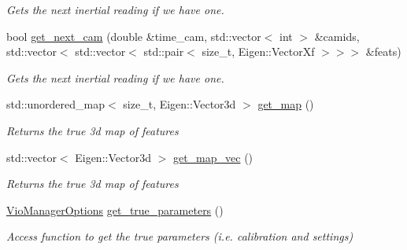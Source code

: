 \begin{DoxyCompactItemize}
\begin{DoxyCompactList}\small\item\em Gets the next inertial reading if we have one. \end{DoxyCompactList}\item 
bool \hyperlink{classov__msckf_1_1Simulator_add03be2fbfa53224369b07411b6a81b7}{get\+\_\+next\+\_\+cam} (double \&time\+\_\+cam, std\+::vector$<$ int $>$ \&camids, std\+::vector$<$ std\+::vector$<$ std\+::pair$<$ size\+\_\+t, Eigen\+::\+Vector\+Xf $>$$>$$>$ \&feats)
\begin{DoxyCompactList}\small\item\em Gets the next inertial reading if we have one. \end{DoxyCompactList}\item 
\mbox{\label{classov__msckf_1_1Simulator_aca2fcef0b73e4c570049030438caa60b}} 
std\+::unordered\+\_\+map$<$ size\+\_\+t, Eigen\+::\+Vector3d $>$ \hyperlink{classov__msckf_1_1Simulator_aca2fcef0b73e4c570049030438caa60b}{get\+\_\+map} ()
\begin{DoxyCompactList}\small\item\em Returns the true 3d map of features \end{DoxyCompactList}\item 
\mbox{\label{classov__msckf_1_1Simulator_aa6f03a9aefbf97bccf950059608bd3c1}} 
std\+::vector$<$ Eigen\+::\+Vector3d $>$ \hyperlink{classov__msckf_1_1Simulator_aa6f03a9aefbf97bccf950059608bd3c1}{get\+\_\+map\+\_\+vec} ()
\begin{DoxyCompactList}\small\item\em Returns the true 3d map of features \end{DoxyCompactList}\item 
\mbox{\label{classov__msckf_1_1Simulator_a3a7f99eb6dd01918d88f6db017c83830}} 
\hyperlink{structov__msckf_1_1VioManagerOptions}{Vio\+Manager\+Options} \hyperlink{classov__msckf_1_1Simulator_a3a7f99eb6dd01918d88f6db017c83830}{get\+\_\+true\+\_\+parameters} ()
\begin{DoxyCompactList}\small\item\em Access function to get the true parameters (i.\+e. calibration and settings) \end{DoxyCompactList}\end{DoxyCompactItemize}
